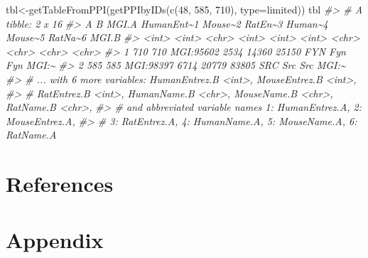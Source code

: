 \documentclass[
]{article}
\newenvironment{Shaded}{\begin{snugshade}}{\end{snugshade}}
\newcommand{\AttributeTok}[1]{\textcolor[rgb]{0.77,0.63,0.00}{#1}}
\newcommand{\CommentTok}[1]{\textcolor[rgb]{0.56,0.35,0.01}{\textit{#1}}}
\newcommand{\DecValTok}[1]{\textcolor[rgb]{0.00,0.00,0.81}{#1}}
\newcommand{\FunctionTok}[1]{\textcolor[rgb]{0.00,0.00,0.00}{#1}}
\newcommand{\NormalTok}[1]{#1}
\newcommand{\OtherTok}[1]{\textcolor[rgb]{0.56,0.35,0.01}{#1}}
\newcommand{\StringTok}[1]{\textcolor[rgb]{0.31,0.60,0.02}{#1}}
\newlength{\cslhangindent}
\newlength{\cslentryspacingunit} %
\newenvironment{CSLReferences}[2] %
 {%
  \setlength{\parindent}{0pt}
  \ifodd #1
  \let\oldpar\par
  \def\par{\hangindent=\cslhangindent\oldpar}
  \fi
  \setlength{\parskip}{#2\cslentryspacingunit}
 }%
 {}
\begin{document}
\begin{Shaded}
\begin{Highlighting}[]
\NormalTok{tbl}\OtherTok{\textless{}{-}}\FunctionTok{getTableFromPPI}\NormalTok{(}\FunctionTok{getPPIbyIDs}\NormalTok{(}\FunctionTok{c}\NormalTok{(}\DecValTok{48}\NormalTok{, }\DecValTok{585}\NormalTok{, }\DecValTok{710}\NormalTok{), }\AttributeTok{type=}\StringTok{\textquotesingle{}limited\textquotesingle{}}\NormalTok{))}
\NormalTok{tbl}
\CommentTok{\#\textgreater{} \# A tibble: 2 x 16}
\CommentTok{\#\textgreater{}       A     B MGI.A     HumanEnt\textasciitilde{}1 Mouse\textasciitilde{}2 RatEn\textasciitilde{}3 Human\textasciitilde{}4 Mouse\textasciitilde{}5 RatNa\textasciitilde{}6 MGI.B}
\CommentTok{\#\textgreater{}   \textless{}int\textgreater{} \textless{}int\textgreater{} \textless{}chr\textgreater{}          \textless{}int\textgreater{}   \textless{}int\textgreater{}   \textless{}int\textgreater{} \textless{}chr\textgreater{}   \textless{}chr\textgreater{}   \textless{}chr\textgreater{}   \textless{}chr\textgreater{}}
\CommentTok{\#\textgreater{} 1   710   710 MGI:95602       2534   14360   25150 FYN     Fyn     Fyn     MGI:\textasciitilde{}}
\CommentTok{\#\textgreater{} 2   585   585 MGI:98397       6714   20779   83805 SRC     Src     Src     MGI:\textasciitilde{}}
\CommentTok{\#\textgreater{} \# ... with 6 more variables: HumanEntrez.B \textless{}int\textgreater{}, MouseEntrez.B \textless{}int\textgreater{},}
\CommentTok{\#\textgreater{} \#   RatEntrez.B \textless{}int\textgreater{}, HumanName.B \textless{}chr\textgreater{}, MouseName.B \textless{}chr\textgreater{}, RatName.B \textless{}chr\textgreater{},}
\CommentTok{\#\textgreater{} \#   and abbreviated variable names 1: HumanEntrez.A, 2: MouseEntrez.A,}
\CommentTok{\#\textgreater{} \#   3: RatEntrez.A, 4: HumanName.A, 5: MouseName.A, 6: RatName.A}
\end{Highlighting}
\end{Shaded}

\hypertarget{references}{%
\section{References}\label{references}}

\hypertarget{refs}{}
\begin{CSLReferences}{0}{0}
\end{CSLReferences}

\hypertarget{appendix}{%
\section{Appendix}\label{appendix}}
\end{document}
